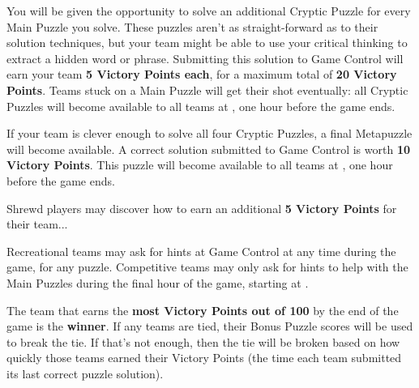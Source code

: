 \begin{multicols}{2}

You will be given the opportunity to solve an additional Cryptic Puzzle for
every Main Puzzle you solve. These puzzles aren't as straight-forward
as to their solution techniques, but your team might be able to use your
critical thinking to extract a hidden word or phrase. Submitting this
solution to Game Control will earn your team \textbf{5 Victory Points each},
for a maximum total of \textbf{20 Victory Points}.
Teams stuck on a Main Puzzle will get their shot eventually: all
Cryptic Puzzles will become available to all teams at \underline{\hspace{5em}},
one hour before the game ends.


If your team is clever enough to solve all four Cryptic Puzzles, a final
Metapuzzle will become available. A correct solution submitted to Game
Control is worth \textbf{10 Victory Points}. This puzzle will become available
to all teams at \underline{\hspace{5em}}, one hour before the game ends.


Shrewd players may discover how to earn an additional
\textbf{5 Victory Points} for their team...


Recreational teams may ask for hints at Game Control at any time during
the game, for any puzzle. Competitive teams may only ask for hints to help with
the Main Puzzles during the final hour of the game, starting at
\underline{\hspace{5em}}.

\columnbreak


The team that earns the \textbf{most Victory Points out of 100}
by the end of the game is the \textbf{winner}. If any teams are tied,
their Bonus Puzzle scores will be used to break the tie. If that's not enough,
then the tie will be broken based on how quickly those teams earned their
Victory Points (the time each team submitted its last correct puzzle solution).
\end{multicols}


